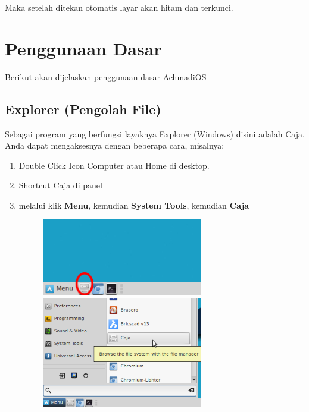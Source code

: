 \documentclass[12pt,]{article}
\begin{document}
	Maka setelah ditekan otomatis layar akan hitam dan terkunci.

	\newpage

	\section{Penggunaan Dasar}

	Berikut akan dijelaskan penggunaan dasar AchmadiOS

	\subsection{Explorer (Pengolah File)}

	Sebagai program yang berfungsi layaknya Explorer (Windows) disini adalah Caja.
	Anda dapat mengaksesnya dengan beberapa cara, misalnya:

	\begin{enumerate}
		\item Double Click Icon Computer atau Home di desktop.
		\item Shortcut Caja di panel
		\item melalui klik \textbf{Menu}, kemudian \textbf{System Tools}, kemudian \textbf{Caja} 
		\begin{figure}[h]
			\centering
			\includegraphics[width=200pt]{png/panelcaja}
			\includegraphics[width=200pt]{png/menucaja}
		\end{figure}
	\end{enumerate}
\end{document}
